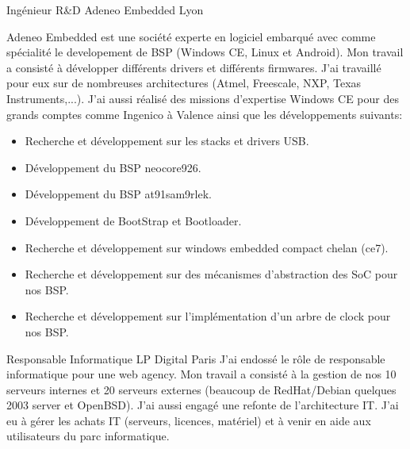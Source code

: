 \documentclass[11pt,a4paper,sans]{moderncv}
\begin{document}
{Ing\'enieur R\&D}
{Adeneo Embedded}
{Lyon}
{}
{Adeneo Embedded est une soci\'et\'e experte en logiciel embarqu\'e 
avec comme sp\'ecialit\'e le developement de BSP (Windows CE, Linux et
Android).
Mon travail a consist\'e \`a d\'evelopper diff\'erents drivers et diff\'erents
firmwares. J'ai travaill\'e pour eux sur de nombreuses architectures 
(Atmel, Freescale, NXP, Texas Instruments,...).
J'ai aussi r\'ealis\'e des missions d'expertise Windows CE pour des 
grands comptes comme Ingenico \`a Valence ainsi que les d\'eveloppements suivants:
\begin{itemize}
\item Recherche et d\'eveloppement sur les stacks et drivers USB.
\item D\'eveloppement du BSP neocore926.
\item D\'eveloppement du BSP at91sam9rlek.
\item D\'eveloppement de BootStrap et Bootloader.
\item Recherche et d\'eveloppement sur windows embedded compact chelan (ce7).
\item Recherche et d\'eveloppement sur des m\'ecanismes d'abstraction des SoC pour nos BSP.
\item Recherche et d\'eveloppement sur l'impl\'ementation d'un arbre de clock pour nos BSP.
\end{itemize}
}

{Responsable Informatique}
{LP Digital}
{Paris}
{}
{J'ai endoss\'e le r\^ole de responsable informatique pour une web agency.\newline{}
Mon travail a consist\'e \`a la gestion de nos 10 serveurs internes et 20 serveurs
externes (beaucoup de RedHat/Debian quelques 2003 server et OpenBSD). J'ai aussi
engag\'e une refonte de l'architecture IT.
J'ai eu \`a g\'erer les achats IT (serveurs, licences, mat\'eriel) et \`a venir en aide
aux utilisateurs du parc informatique.
}
\end{document}
